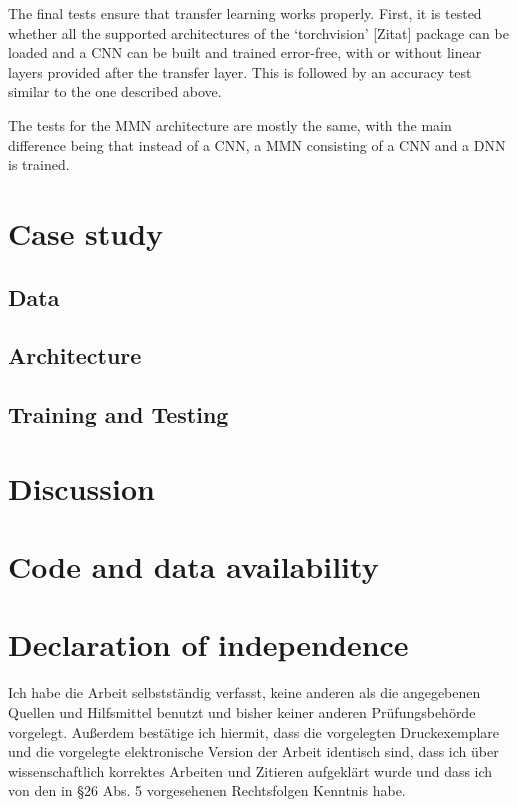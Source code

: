 \documentclass{article}
\newcommand{\pkg}[1]{`#1'}
\begin{document}
The final tests ensure that transfer learning works properly. First, it is tested whether all the supported architectures of the \pkg{torchvision} [Zitat] package can be loaded and a CNN can be built and trained error-free, with or without linear layers provided after the transfer layer. This is followed by an accuracy test similar to the one described above.

The tests for the MMN architecture are mostly the same, with the main difference being that instead of a CNN, a MMN consisting of a CNN and a DNN is trained.





\section{Case study}
\subsection{Data}
\subsection{Architecture}
\subsection{Training and Testing}


\section{Discussion}
\section*{Code and data availability}
\section*{Declaration of independence}
Ich habe die Arbeit selbstständig verfasst, keine anderen als die angegebenen Quellen und Hilfsmittel benutzt und bisher keiner anderen Prüfungsbehörde vorgelegt. Außerdem bestätige ich hiermit, dass die vorgelegten Druckexemplare und die vorgelegte elektronische Version der Arbeit identisch sind, dass ich über wissenschaftlich korrektes Arbeiten und Zitieren aufgeklärt wurde und dass ich von den in §26 Abs. 5 vorgesehenen Rechtsfolgen Kenntnis habe.


 



\end{document}
